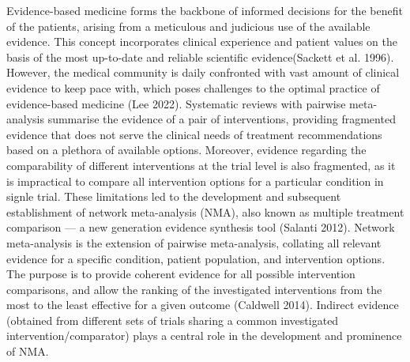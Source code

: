 Evidence-based medicine forms the backbone of informed decisions for the benefit of
the patients, arising from a meticulous and judicious use of the available evidence. This concept
incorporates clinical experience and patient values on the basis of the most up-to-date and reliable scientific evidence(Sackett et al. 1996).
However, the medical community is daily confronted with vast amount of clinical evidence to keep pace with, which poses challenges to the optimal practice of evidence-based medicine (Lee 2022).
Systematic reviews with pairwise meta-analysis summarise the evidence of a pair of
interventions, providing fragmented evidence that does not serve the clinical needs of treatment recommendations based on a plethora of available options.
Moreover, evidence regarding the comparability of different interventions at the trial
level is also fragmented, as it is impractical to compare all intervention options
for a particular condition in signle trial. These limitations led to the development and subsequent
establishment of network meta-analysis (NMA), also known as multiple treatment
comparison --- a new generation evidence synthesis tool (Salanti 2012). Network
meta-analysis is the extension of pairwise meta-analysis, collating all relevant
evidence for a specific condition, patient population, and intervention
options. The purpose is to provide coherent evidence for all possible intervention comparisons,
and allow the ranking of the investigated interventions from the most to the least effective
for a given outcome (Caldwell 2014). Indirect evidence (obtained from different
sets of trials sharing a common investigated intervention/comparator) plays a central role in the development
and prominence of NMA.

